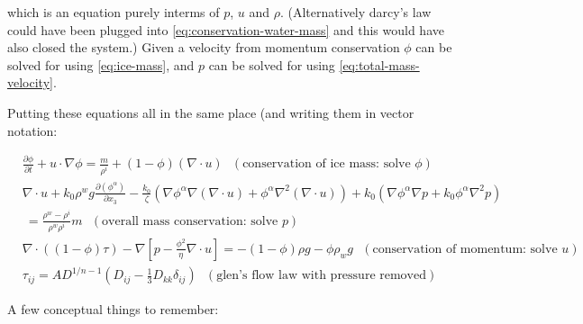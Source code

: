 \documentclass[a4paper,12pt]{article}
\newcommand{\pd}[2]{\frac{\partial #1}{\partial #2}}
\begin{document}
which is an equation purely interms of $p$, $u$ and $\rho$. (Alternatively darcy's law could have been plugged into \eqref{eq:conservation-water-mass} and this would have also closed the system.) Given a velocity from momentum conservation $\phi$ can be solved for using \eqref{eq:ice-mass}, and $p$ can be solved for using \eqref{eq:total-mass-velocity}.

Putting these equations all in the same place (and writing them in vector notation:

\begin{align}
  &\pd{\phi}{t} + u \cdot \nabla \phi = \frac{m}{\rho^i} + (1 - \phi)(\nabla \cdot u) ~~~ (\text{conservation of ice mass: solve } \phi)\\ \label{eq:conservation-ice-mass-2}
  &\nabla \cdot u + k_0\rho^wg\pd{(\phi^{\alpha})}{x_3} - \frac{k_0}{\zeta}(\nabla \phi^\alpha\nabla(\nabla \cdot u) + \phi^\alpha \nabla^2(\nabla \cdot u)) + k_0(\nabla \phi^\alpha\nabla p + k_0\phi^\alpha \nabla^2 p)\\ \label{eq:overall-mass-conservation} \nonumber
  &\ = \frac{\rho^w - \rho^i}{\rho^w \rho^i} m ~~~ (\text{overall mass conservation: solve } p)\\ 
  & \nabla \cdot ((1-\phi)\tau) - \nabla \left[p - \frac{\phi^2}{\eta}\nabla \cdot u\right] = -(1 - \phi) \rho g - \phi \rho_w g ~~~ (\text{conservation of momentum: solve } u)\\ \label{eq:conservation-of-momentum-temperate}
  &\tau_{ij} = A D^{1/n-1}(D_{ij} - \frac{1}{3}D_{kk}\delta_{ij}) ~~~ (\text{glen's flow law with pressure removed})
\end{align}

A few conceptual things to remember:
\end{document}
